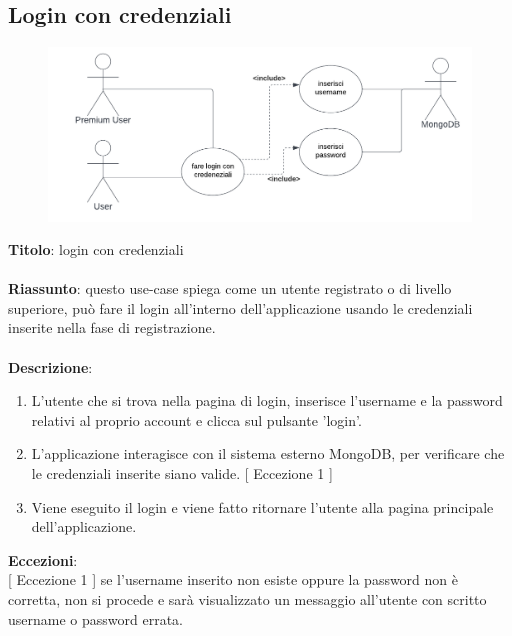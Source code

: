 \subsection{Login con credenziali} \label{req_login_con_credenziali}
\begin{figure}[!h]
\centering
\includegraphics[scale=0.35]{images/use_case_login_con_credenziali.png}
\end{figure}
\noindent
\textbf{Titolo}: login con credenziali \\
\\
\textbf{Riassunto}: questo use-case spiega come un utente registrato o di livello superiore, può fare il login all'interno dell'applicazione usando le credenziali inserite nella fase di registrazione. \\
\\
\textbf{Descrizione}:
\begin{enumerate}
    \item L'utente che si trova nella pagina di login, inserisce l'username e la password relativi al proprio account e clicca sul pulsante 'login'.
    \item L'applicazione interagisce con il sistema esterno MongoDB, per verificare che le credenziali inserite siano valide. {[ Eccezione 1 ]}
    \item Viene eseguito il login e viene fatto ritornare l'utente alla pagina principale dell'applicazione.
\end{enumerate}
\textbf{Eccezioni}: \\
{[ Eccezione 1 ]} se l'username inserito non esiste oppure la password non è corretta, non si procede e sarà visualizzato un messaggio all'utente con scritto username o password errata.
\newpage

